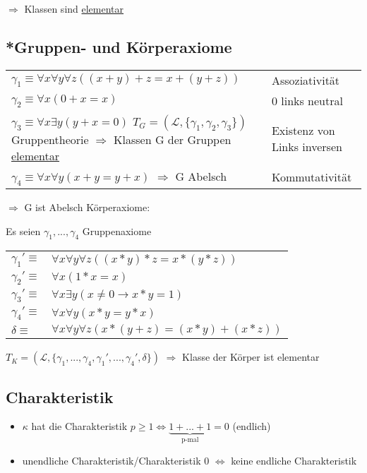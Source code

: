 \documentclass[12pt,a4paper]{article} %
\begin{document}
	$\Rightarrow$ Klassen sind \hyperref[Elementar]{elementar}

	\subsection{*Gruppen- und Körperaxiome}
	\begin{tabular}{p{7cm} l}
		$\gamma_1 \equiv \forall x \forall y \forall z ((x + y) + z = x + (y + z))$ & Assoziativität \\
		$\gamma_2 \equiv \forall x (0 + x = x)$ & 0 links neutral \\
		$\gamma_3 \equiv \forall x \exists y (y + x = 0)$ \newline $T_G = (\mathcal{L}, \{\gamma_1, \gamma_2, \gamma_3\})$ Gruppentheorie \newline $\Rightarrow$ Klassen G der Gruppen \hyperref[Elementar]{elementar} & Existenz von Links inversen \\
		$\gamma_4 \equiv \forall x \forall y (x + y = y + x)$ \newline $\Rightarrow$ G Abelsch & Kommutativität \\
	\end{tabular}

	$\Rightarrow$ G ist Abelsch \newline
	Körperaxiome:
	
	Es seien $\gamma_1, ..., \gamma_4$ Gruppenaxiome
	
	\begin{tabular}{l l}
		$\gamma_1' \equiv$ & $\forall x \forall y \forall z ((x * y) * z = x * (y * z))$ \\
		$\gamma_2' \equiv$ & $\forall x (1 * x = x)$ \\
		$\gamma_3' \equiv$ & $\forall x \exists y (x \ne 0 \rightarrow x * y = 1)$ \\
		$\gamma_4' \equiv$ & $\forall x \forall y (x * y = y * x)$ \\
		$\delta \equiv$ & $\forall x \forall y \forall z (x * (y + z) = (x * y) + (x * z))$
	\end{tabular}
	
	$T_K = (\mathcal{L}, \{\gamma_1, ..., \gamma_4, \gamma_1', ..., \gamma_4', \delta\})$\newline
	$\Rightarrow$ Klasse der Körper ist elementar
	
	\subsection{Charakteristik}
	\begin{itemize}
		\item $\kappa$ hat die Charakteristik $p \ge 1 \Leftrightarrow \underbrace{1 + ... + 1}_\text{p-mal} = 0$ (endlich)
		\item unendliche Charakteristik/Charakteristik 0 $\Leftrightarrow$ keine endliche Charakteristik
	\end{itemize}
	
\end{document}
